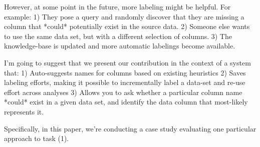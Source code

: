 However, at some point in the future, more labeling might be helpful.  For example:
1) They pose a query and randomly discover that they are missing a column that *could* potentially exist in the source data.
2) Someone else wants to use the same data set, but with a different selection of columns.
3) The knowledge-base is updated and more automatic labelings become available.

I'm going to suggest that we present our contribution in the context of a system that:
1) Auto-suggests names for columns based on existing heuristics
2) Saves labeling efforts, making it possible to incrementally label a data-set and re-use effort across analyses
3) Allows you to ask whether a particular column name *could* exist in a given data set, and identify the data column that most-likely represents it.

Specifically, in this paper, we're conducting a case study evaluating one particular approach to task (1).  